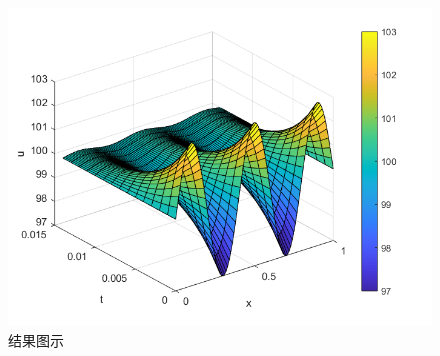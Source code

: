 \documentclass[12pt]{ctexart}
\begin{document}
    \begin{figure}[htbp]
        \small
        \centering
        \includegraphics[width=16cm]{fig1.png}
        \caption{结果图示} \label{Fig:aa}
    \end{figure}
\end{document}
